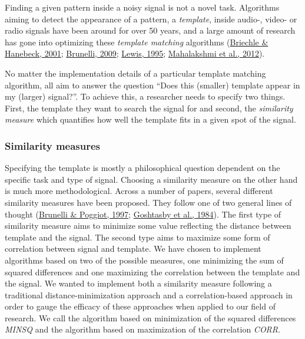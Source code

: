 \documentclass[
  man]{apa7}
\begin{document}
Finding a given pattern inside a noisy signal is not a novel task. Algorithms aiming to detect the appearance of a pattern, a \emph{template}, inside audio-, video- or radio signals have been around for over 50 years, and a large amount of research has gone into optimizing these \emph{template matching} algorithms (\protect\hyperlink{ref-briechle2001template}{Briechle \& Hanebeck, 2001}; \protect\hyperlink{ref-brunelli2009template}{Brunelli, 2009}; \protect\hyperlink{ref-lewis1995fast}{Lewis, 1995}; \protect\hyperlink{ref-mahalakshmi2012image}{Mahalakshmi et al., 2012}).

No matter the implementation details of a particular template matching algorithm, all aim to answer the question ``Does this (smaller) template appear in my (larger) signal?''. To achieve this, a researcher needs to specify two things. First, the template they want to search the signal for and second, the \emph{similarity measure} which quantifies how well the template fits in a given spot of the signal.

\hypertarget{similarity-measures}{%
\subsubsection{Similarity measures}\label{similarity-measures}}

Specifying the template is mostly a philosophical question dependent on the specific task and type of signal. Choosing a similarity measure on the other hand is much more methodological. Across a number of papers, several different similarity measures have been proposed. They follow one of two general lines of thought (\protect\hyperlink{ref-brunelli1997template}{Brunelli \& Poggiot, 1997}; \protect\hyperlink{ref-goshtasby1984two}{Goshtasby et al., 1984}). The first type of similarity measure aims to minimize some value reflecting the distance between template and the signal. The second type aims to maximize some form of correlation between signal and template. We have chosen to implement algorithms based on two of the possible measures, one minimizing the sum of squared differences and one maximizing the correlation between the template and the signal. We wanted to implement both a similarity measure following a traditional distance-minimization approach and a correlation-based approach in order to gauge the efficacy of these approaches when applied to our field of research. We call the algorithm based on minimization of the squared differences \emph{MINSQ} and the algorithm based on maximization of the correlation \emph{CORR}.
\end{document}
